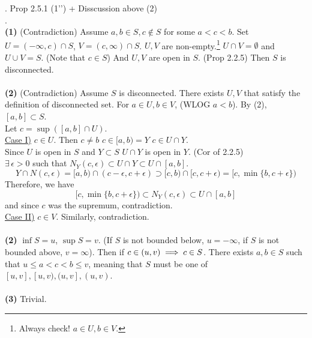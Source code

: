 \rmk. Prop 2.5.1 (1'') + Disscussion above (2)\\
\pf.\\
\textbf{(1)} (Contradiction) Assume $a, b\in S, c\notin S$ for some $a<c<b$. Set $U = (-\infty, c)\cap S$, $V = (c, \infty)\cap S$. $U, V$ are non-empty.\footnote{Always check! $a\in U, b\in V$.} $U \cap V = \emptyset$ and $U\cup V = S$. (Note that $c\in S$) And $U, V$ are open in $S$. (Prop 2.2.5) Then $S$ is disconnected.\\
\\
\textbf{(2)} (Contradiction) Assume $S$ is disconnected. There exists $U, V$ that satisfy the definition of disconnected set. For $a\in U, b\in V$, (WLOG $a<b$). By (2), $[a, b]\subset S$.\\
Let $c = \sup([a, b]\cap U)$.\\
\underline{Case I)} $c\in U$. Then $c\neq b$ \mimp $c\in [a, b) = Y$ \mimp $c\in U\cap Y$.\\
Since $U$ is open in $S$ and $Y\subset S$ \mimp $U\cap Y$ is open in $Y$. (Cor of 2.2.5)\\
\mimp $\exists\, \epsilon>0$ such that $N_Y(c, \epsilon) \subset U\cap Y \subset U\cap [a, b]$.
$$Y\cap N(c, \epsilon) = [a, b)\cap (c-\epsilon, c+\epsilon)\supset [c, b)\cap [c, c+\epsilon) = [c, \min\{b, c+\epsilon\})$$
Therefore, we have $$[c, \min\{b, c+\epsilon\}) \subset N_Y(c, \epsilon) \subset U\cap [a, b]$$
and since $c$ was the supremum, contradiction. 
\\
\underline{Case II)} $c\in V$. Similarly, contradiction.\\
\\
\textbf{(2)} $\inf S = u$, $\sup S = v$. (If $S$ is not bounded below, $u = -\infty$, if $S$ is not bounded above, $v = \infty$). Then if $c\in (u, v) \implies c\in S$. There exists $a, b\in S$ such that $u \leq a < c < b \leq v$, meaning that $S$ must be one of $[u, v], [u, v), (u, v], (u, v)$.\\
\\
\textbf{(3)} Trivial.